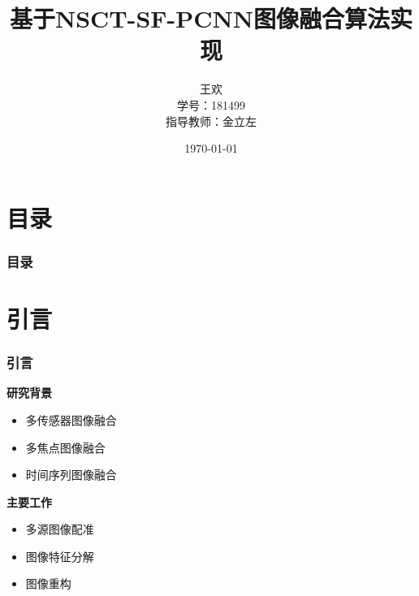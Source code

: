 \documentclass[10pt,aspectratio=43,mathserif]{beamer}
\title[基于NSCT-SF-PCNN图像融合算法实现]{\fontsize{13pt}{18pt}\selectfont \textbf{基于NSCT-SF-PCNN图像融合算法实现}}
\author[H. Wang]{
  王欢
  \\
  {\small {学号：181499}} \\
  {\small {指导教师：金立左}}}
\institute[SEUAuto]{
  东南大学自动化学院}
\date[\today]{
 \today}
\begin{document}
\begin{frame}
\titlepage
\end{frame}				%



\section*{目录}

		\begin{frame}
		\frametitle{\textbf{目录}}
		\textbf{\tableofcontents}
		\end{frame}				%

\section{引言}
		\begin{frame}
			\frametitle{\textbf{引言}}
            \begin{block}{\textbf{研究背景}}
                \begin{itemize}
                    \item 多传感器图像融合
                    \item 多焦点图像融合
                    \item 时间序列图像融合
                \end{itemize}
            \end{block}

            \begin{block}{\textbf{主要工作}}
                \begin{itemize}
                    \item 多源图像配准
                    \item 图像特征分解
                    \item 图像重构
                \end{itemize}
            \end{block}
        \end{frame}
\end{document}
